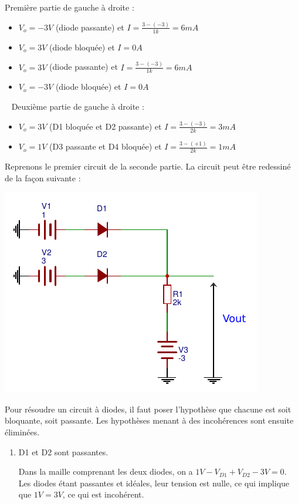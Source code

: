 \documentclass{../../template/tp}
\begin{document}
{%
Première partie de gauche à droite :
\begin{itemize}
    \item $V_o = -3V$ (diode passante) et $I = \frac{3-(-3)}{1k}=6mA$
    \item $V_o = 3V$ (diode bloquée) et $I=0A$
    \item $V_o = 3V$ (diode passante) et $I= \frac{3-(-3)}{1k}=6mA$
    \item $V_o = -3V$ (diode bloquée) et $I = 0A$
\end{itemize}
~\newline
Deuxième partie de gauche à droite :
\begin{itemize}
    \item $V_o = 3V$ (D1 bloquée et D2 passante) et $I = \frac{3-(-3)}{2k} = 3mA$
    \item $V_o = 1V$ (D3 passante et D4 bloquée) et $I = \frac{3-(+1)}{2k} = 1mA$
\end{itemize}

Reprenons le premier circuit de la seconde partie.
La circuit peut être redessiné de la façon suivante :
\begin{center}
    \includegraphics[scale=1.4]{ex3-corrige}
\end{center}

Pour résoudre un circuit à diodes, il faut poser l'hypothèse que chacune est soit bloquante, soit passante.
Les hypothèses menant à des incohérences sont ensuite éliminées.

\begin{enumerate}
    \item D1 et D2 sont passantes.

    Dans la maille comprenant les deux diodes, on a $1V - V_{D1} + V_{D2} - 3V = 0$.
    Les diodes étant passantes et idéales, leur tension est nulle, ce qui implique que $1V = 3V$, ce qui est incohérent.


\end{enumerate}}
\end{document}
